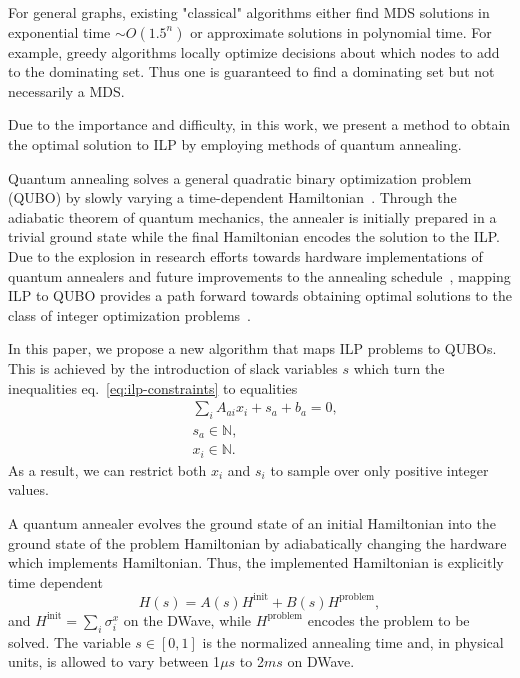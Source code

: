 \documentclass[prd,twocolumn,tightenlines,preprintnumbers,showpacs,superscriptaddress,notitlepage,nofootinbib,eqsecnum,floatfix,longbibliography,aps,10pt]{revtex4-2}
\begin{document}
For general graphs, existing "classical" algorithms either find MDS solutions in exponential time $\sim O( 1.5^n)$ \cite{Fomin2009, vanRooij2009} or approximate solutions in polynomial time. For example, greedy algorithms locally optimize decisions about which nodes to add to the dominating set.
Thus one is guaranteed to find a dominating set but not necessarily a MDS.

Due to the importance and difficulty, in this work, we present a method to obtain the optimal solution to ILP by employing methods of quantum annealing.

Quantum annealing solves a general quadratic binary optimization problem (QUBO) by slowly varying a time-dependent Hamiltonian~\cite{}.
Through the adiabatic theorem of quantum mechanics, the annealer is initially prepared in a trivial ground state while the final Hamiltonian encodes the solution to the ILP.
Due to the explosion in research efforts towards hardware implementations of quantum annealers and future improvements to the annealing schedule~\cite{}, mapping ILP to QUBO provides a path forward towards obtaining optimal solutions to the class of integer optimization problems~\cite{2018Glover}.

In this paper, we propose a new algorithm that maps ILP problems to QUBOs.
This is achieved by the introduction of slack variables $s$ which turn the inequalities eq.~\eqref{eq:ilp-constraints} to equalities
\begin{align}
  & \sum_i A_{a i}x_i + s_a + b_a = 0, \\
  & s_a \in \mathbb{N},                \\
  & x_i \in \mathbb{N}.
\end{align}
As a result, we can restrict both $x_i$ and $s_i$ to sample over only positive integer values.



A quantum annealer evolves the ground state of an initial Hamiltonian into the ground state of the problem Hamiltonian by adiabatically changing the hardware which implements Hamiltonian.
Thus, the implemented Hamiltonian is explicitly time dependent
\begin{equation}
 H(s) = A(s) H^{\textrm{init}} + B(s) H^{\textrm{problem}}, \label{eq:tdhamiltonian}
\end{equation}
and $H^\textrm{init}=\sum_i\sigma^x_i$ on the DWave, while $H^\textrm{problem}$ encodes the problem to be solved.
The variable $s\in [0, 1]$ is the normalized annealing time and, in physical units, is allowed to vary between 1$\mu s$ to 2$ms$ on DWave.
\end{document}
